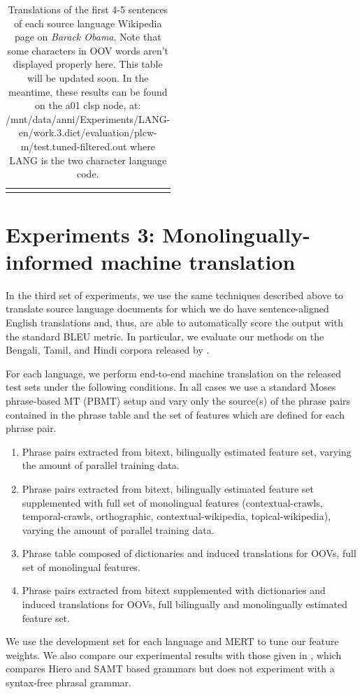 \documentclass[11pt]{article}
\begin{document}
\begin{center}
\begin{longtable}{|p{1.5cm}|p{13cm}|}
\hline
\caption{Translations of the first 4-5 sentences of each source language Wikipedia page on {\it Barack Obama}. Note that some characters in OOV words aren't displayed properly here. This table will be updated soon. In the meantime, these results can be found on the a01 clsp node, at: /mnt/data/anni/Experiments/LANG-en/work.3.dict/evaluation/plcw-m/test.tuned-filtered.out where LANG is the two character language code.} \label{table:qualtrans}  \\
\end{longtable}
\end{center}

\twocolumn

\section{Experiments 3: Monolingually-informed machine translation}

In the third set of experiments, we use the same techniques described above to translate source language documents for which we do have sentence-aligned English translations and, thus, are able to automatically score the output with the standard BLEU metric. In particular, we evaluate our methods on the Bengali, Tamil, and Hindi corpora released by .

For each language, we perform end-to-end machine translation on the released test sets under the following conditions. In all cases we use a standard Moses phrase-based MT (PBMT) setup and vary only the source(s) of the phrase pairs contained in the phrase table and the set of features which are defined for each phrase pair.
\begin{enumerate}
\item{Phrase pairs extracted from bitext, bilingually estimated feature set, varying the amount of parallel training data.}
\item{Phrase pairs extracted from bitext, bilingually estimated feature set supplemented with full set of monolingual features (contextual-crawls, temporal-crawls, orthographic, contextual-wikipedia, topical-wikipedia), varying the amount of parallel training data. }
\item{Phrase table composed of dictionaries and induced translations for OOVs, full set of monolingual features.}
\item{Phrase pairs extracted from bitext supplemented with dictionaries and induced translations for OOVs, full bilingually and monolingually estimated feature set.}
\end{enumerate}
We use the development set for each language and MERT to tune our feature weights. We also compare our experimental results with those given in , which compares Hiero and SAMT based grammars but does not experiment with a syntax-free phrasal grammar. 
\end{document}
